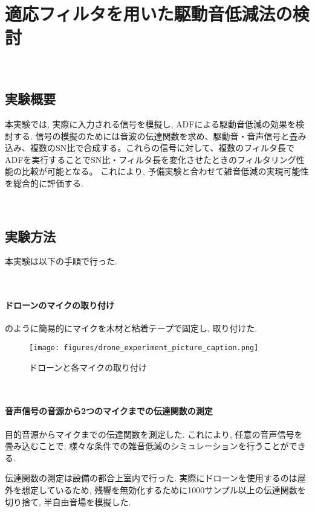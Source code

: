 \chapter{適応フィルタを用いた駆動音低減法の検討}\label{adf-practice}

\
\section{実験概要}\label{purpose-practice}

本実験では, 実際に入力される信号を模擬し, ADFによる駆動音低減の効果を検討する. 信号の模擬のためには音波の伝達関数を求め、駆動音・音声信号と畳み込み、複数のSN比で合成する。これらの信号に対して、複数のフィルタ長でADFを実行することでSN比・フィルタ長を変化させたときのフィルタリング性能の比較が可能となる。
これにより, 予備実験と合わせて雑音低減の実現可能性を総合的に評価する. 

\newpage

\
\section{実験方法}\label{instruction-practice}

本実験は以下の手順で行った. 

\
\subsubsection{ドローンのマイクの取り付け}\label{installment-mic}

のように簡易的にマイクを木材と粘着テープで固定し, 取り付けた. 

\begin{figure}[H]
\centering
\texttt{[image: figures/drone\_experiment\_picture\_caption.png]}
\caption{ドローンと各マイクの取り付け}
\label{fig:drone_experiment}
\end{figure}

\
\subsubsection{音声信号の音源から2つのマイクまでの伝達関数の測定}\label{observation-tf}

目的音源からマイクまでの伝達関数を測定した. これにより, 任意の音声信号を畳み込むことで, 様々な条件での雑音低減のシミュレーションを行うことができる. 

伝達関数の測定は設備の都合上室内で行った. 実際にドローンを使用するのは屋外を想定しているため, 残響を無効化するために1000サンプル以上の伝達関数を切り捨て, 半自由音場を模擬した. 

